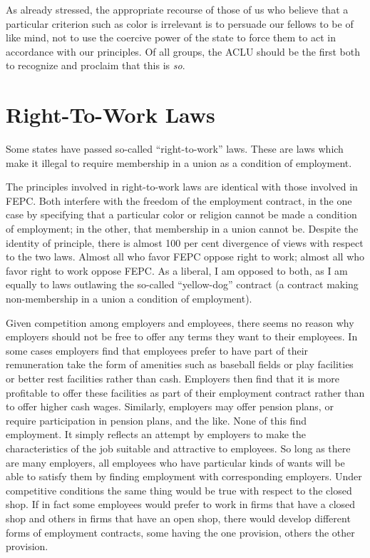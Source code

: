 \documentclass[11pt,openany]{book}
\newcommand{\booksection}[1]{%
  \phantomsection\section*{#1}%
  \addcontentsline{toc}{section}{#1}\markright{#1}}
\begin{document}
As already stressed, the appropriate recourse of those of us who believe that a particular criterion such as color is irrelevant is to persuade our fellows to be of like mind, not to use the coercive power of the state to force them to act in accordance with our principles. Of all groups, the ACLU should be the first both to recognize and proclaim that this is \emph{so}.

\booksection{Right-To-Work Laws}

Some states have passed so-called ``right-to-work'' laws. These are laws which make it illegal to require membership in a union as a condition of employment.

The principles involved in right-to-work laws are identical with those involved in FEPC. Both interfere with the freedom of the employment contract, in the one case by specifying that a particular color or religion cannot be made a condition of employment; in the other, that membership in a union cannot be. Despite the identity of principle, there is almost 100 per cent divergence of views with respect to the two laws. Almost all who favor FEPC oppose right to work; almost all who favor right to work oppose FEPC. As a liberal, I am opposed to both, as I am equally to laws outlawing the so-called ``yellow-dog'' contract (a contract making non-membership in a union a condition of employment).

Given competition among employers and employees, there seems no reason why employers should not be free to offer any terms they want to their employees. In some cases employers find that employees prefer to have part of their remuneration take the form of amenities such as baseball fields or play facilities or better rest facilities rather than cash. Employers then find that it is more profitable to offer these facilities as part of their employment contract rather than to offer higher cash wages. Similarly, employers may offer pension plans, or require participation in pension plans, and the like. None of this find employment. It simply reflects an attempt by employers to make the characteristics of the job suitable and attractive to employees. So long as there are many employers, all employees who have particular kinds of wants will be able to satisfy them by finding employment with corresponding employers. Under competitive conditions the same thing would be true with respect to the closed shop. If in fact some employees would prefer to work in firms that have a closed shop and others in firms that have an open shop, there would develop different forms of employment contracts, some having the one provision, others the other provision.
\end{document}
